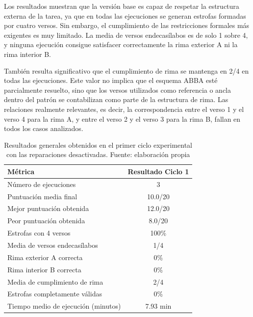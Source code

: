 \documentclass[12pt,a4paper,twoside,openright]{book}
\begin{document}
Los resultados muestran que la versión base es capaz de respetar la estructura externa de la tarea, ya que en todas las ejecuciones se generan estrofas formadas por cuatro versos. Sin embargo, el cumplimiento de las restricciones formales más exigentes es muy limitado. La media de versos
endecasílabos es de solo 1 sobre 4, y ninguna ejecución consigue satisfacer correctamente la rima exterior A ni la rima interior B.

También resulta significativo que el cumplimiento de rima se mantenga en 2/4 en todas las ejecuciones. Este valor no implica que el esquema ABBA esté parcialmente resuelto, sino que los versos utilizados como referencia o ancla dentro del patrón se contabilizan como parte de la estructura de rima.
Las relaciones realmente relevantes, es decir, la correspondencia entre el verso 1 y el verso 4 para la rima A, y entre el verso 2 y el verso 3 para la rima B, fallan en todos los casos analizados.

\begin{table}[h]
    \centering
    \begin{tabular}{|l|c|}
        \hline
        \textbf{Métrica} & \textbf{Resultado Ciclo 1} \\
        \hline
        Número de ejecuciones & 3 \\
        \hline
        Puntuación media final & 10.0/20 \\
        \hline
        Mejor puntuación obtenida & 12.0/20 \\
        \hline
        Peor puntuación obtenida & 8.0/20 \\
        \hline
        Estrofas con 4 versos & 100\% \\
        \hline
        Media de versos endecasílabos & 1/4 \\
        \hline
        Rima exterior A correcta & 0\% \\
        \hline
        Rima interior B correcta & 0\% \\
        \hline
        Media de cumplimiento de rima & 2/4 \\
        \hline
        Estrofas completamente válidas & 0\% \\
        \hline
        Tiempo medio de ejecución (minutos) & 7.93 min \\
        \hline
    \end{tabular}
    \caption{Resultados generales obtenidos en el primer ciclo experimental con las reparaciones desactivadas. Fuente: elaboración propia}
    \label{tab:resultadosCiclo1}
\end{table}
\end{document}
